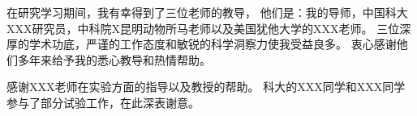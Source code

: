 
\begin{acknowledgements}

在研究学习期间，我有幸得到了三位老师的教导，
他们是：我的导师，中国科大XXX研究员，中科院X昆明动物所马老师以及美国犹他大学的XXX老师。
三位深厚的学术功底，严谨的工作态度和敏锐的科学洞察力使我受益良多。
衷心感谢他们多年来给予我的悉心教导和热情帮助。

感谢XXX老师在实验方面的指导以及教授的帮助。
科大的XXX同学和XXX同学参与了部分试验工作，在此深表谢意。

\end{acknowledgements}
